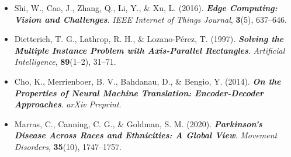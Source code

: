 \begin{itemize}
    \item Shi, W., Cao, J., Zhang, Q., Li, Y., \& Xu, L. (2016). \textbf{\textit{Edge Computing: Vision and Challenges}}. \textit{IEEE Internet of Things Journal}, \textbf{3}(5), 637--646.

    \item Dietterich, T. G., Lathrop, R. H., \& Lozano-Pérez, T. (1997). \textbf{\textit{Solving the Multiple Instance Problem with Axis-Parallel Rectangles}}. \textit{Artificial Intelligence}, \textbf{89}(1--2), 31--71.

    \item Cho, K., Merrienboer, B. V., Bahdanau, D., \& Bengio, Y. (2014). \textbf{\textit{On the Properties of Neural Machine Translation: Encoder-Decoder Approaches}}. \textit{arXiv Preprint}.

    \item Marras, C., Canning, C. G., \& Goldman, S. M. (2020). \textbf{\textit{Parkinson’s Disease Across Races and Ethnicities: A Global View}}. \textit{Movement Disorders}, \textbf{35}(10), 1747--1757.
\end{itemize}
